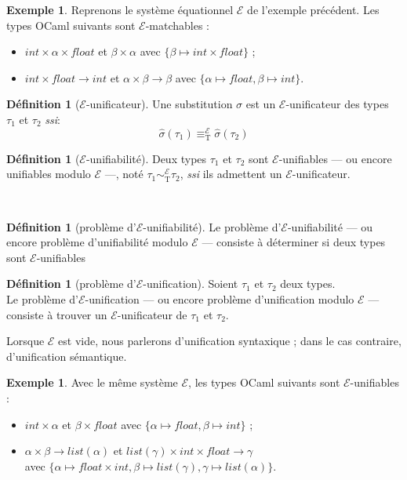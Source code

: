 \documentclass[a4paper]{report}
\theoremstyle{definition}
\newtheorem{definition}[theoreme]{Définition}
\newtheorem{exemple}[theoreme]{Exemple}
\newcommand{\ssi}{\textit{ssi}\xspace}
\newcommand{\E}{\mathscr{E}}
\newcommand{\T}{\mathrm{T}}
\newcommand\laure[1]{{\bf\color{WildStrawberry}{TODO: #1}}\\}
\begin{document}
\begin{exemple}
  Reprenons le système équationnel $\E$ de l'exemple précédent. Les types OCaml suivants sont $\E$-matchables :
  \begin{itemize}
    \item $int \times \alpha \times float$ et $\beta \times \alpha$ avec $\{ \beta \mapsto int \times float \}$ ;
    \item $int \times float \rightarrow int$ et $\alpha \times \beta \rightarrow \beta$ avec $\{ \alpha \mapsto float, \beta \mapsto int \}$.
  \end{itemize}
\end{exemple}

\begin{definition}[$\E$-unificateur]
  Une substitution $\sigma$ est un $\E$-unificateur des types $\tau_1$ et $\tau_2$ \ssi :
  \[ \hat\sigma (\tau_1) \equiv_\T^\E \hat\sigma (\tau_2) \]
\end{definition}

\begin{definition}[$\E$-unifiabilité]
  Deux types $\tau_1$ et $\tau_2$ sont $\E$-unifiables — ou encore unifiables modulo $\E$ —, noté $\tau_1 \sim_\T^\E \tau_2$, \ssi ils admettent un $\E$-unificateur.
\end{definition}

\laure{idem pour les deux defs d'en dessus}
\begin{definition}[problème d'$\E$-unifiabilité]
  Le problème d'$\E$-unifiabilité — ou encore problème d'unifiabilité modulo $\E$ — consiste à déterminer si deux types sont $\E$-unifiables \laure{, c'est-à-dire ...}
\end{definition}

\begin{definition}[problème d'$\E$-unification]
  Soient $\tau_1$ et $\tau_2$ deux types. \\
  Le problème d'$\E$-unification — ou encore problème d'unification modulo $\E$ — consiste à trouver un $\E$-unificateur de $\tau_1$ et $\tau_2$.
\end{definition}

Lorsque $\E$ est vide, nous parlerons d'unification syntaxique ; dans le cas contraire, d'unification sémantique.

\begin{exemple}
  Avec le même système $\E$, les types OCaml suivants sont $\E$-unifiables :
  \begin{itemize}
    \item $int \times \alpha$ et $\beta \times float$ avec $\{ \alpha \mapsto float, \beta \mapsto int \}$ ;
    \item $\alpha \times \beta \rightarrow list (\alpha)$ et $list (\gamma) \times int \times float \rightarrow \gamma$ \\ avec $\{ \alpha \mapsto float \times int, \beta \mapsto list (\gamma), \gamma \mapsto list (\alpha) \}$.
  \end{itemize}
\end{exemple}
\end{document}
